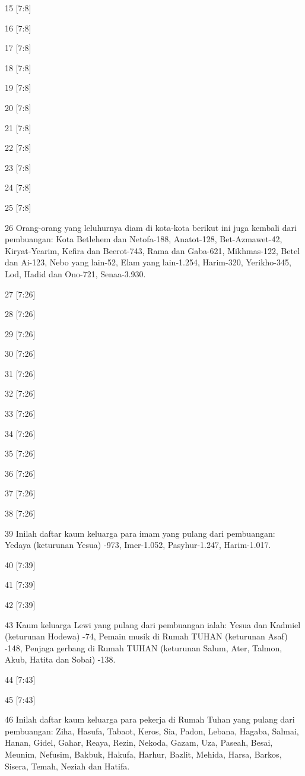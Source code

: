 \par 15 [7:8]
\par 16 [7:8]
\par 17 [7:8]
\par 18 [7:8]
\par 19 [7:8]
\par 20 [7:8]
\par 21 [7:8]
\par 22 [7:8]
\par 23 [7:8]
\par 24 [7:8]
\par 25 [7:8]
\par 26 Orang-orang yang leluhurnya diam di kota-kota berikut ini juga kembali dari pembuangan: Kota Betlehem dan Netofa-188, Anatot-128, Bet-Azmawet-42, Kiryat-Yearim, Kefira dan Beerot-743, Rama dan Gaba-621, Mikhmas-122, Betel dan Ai-123, Nebo yang lain-52, Elam yang lain-1.254, Harim-320, Yerikho-345, Lod, Hadid dan Ono-721, Senaa-3.930.
\par 27 [7:26]
\par 28 [7:26]
\par 29 [7:26]
\par 30 [7:26]
\par 31 [7:26]
\par 32 [7:26]
\par 33 [7:26]
\par 34 [7:26]
\par 35 [7:26]
\par 36 [7:26]
\par 37 [7:26]
\par 38 [7:26]
\par 39 Inilah daftar kaum keluarga para imam yang pulang dari pembuangan: Yedaya (keturunan Yesua) -973, Imer-1.052, Pasyhur-1.247, Harim-1.017.
\par 40 [7:39]
\par 41 [7:39]
\par 42 [7:39]
\par 43 Kaum keluarga Lewi yang pulang dari pembuangan ialah: Yesua dan Kadmiel (keturunan Hodewa) -74, Pemain musik di Rumah TUHAN (keturunan Asaf) -148, Penjaga gerbang di Rumah TUHAN (keturunan Salum, Ater, Talmon, Akub, Hatita dan Sobai) -138.
\par 44 [7:43]
\par 45 [7:43]
\par 46 Inilah daftar kaum keluarga para pekerja di Rumah Tuhan yang pulang dari pembuangan: Ziha, Hasufa, Tabaot, Keros, Sia, Padon, Lebana, Hagaba, Salmai, Hanan, Gidel, Gahar, Reaya, Rezin, Nekoda, Gazam, Uza, Paseah, Besai, Meunim, Nefusim, Bakbuk, Hakufa, Harhur, Bazlit, Mehida, Harsa, Barkos, Sisera, Temah, Neziah dan Hatifa.
